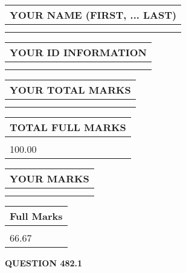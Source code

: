 \documentclass{ctexart}
\begin{document}
   
   
   
\newpage 
\setcounter{page}{ 
   482001 } 
   
   
   
   
\noindent\begin{tabular}{|l|}
\hline
YOUR NAME (FIRST, ... LAST)  \\
\hline
 \\ 
 \\ 
\hline
\end{tabular}
\hspace{0.05in} \begin{tabular}{|l|}
\hline
 YOUR   ID   INFORMATION  \\
\hline
 \\ 
 \\ 
\hline
\end{tabular}
   
   
\vspace{0.2in}\noindent\begin{tabular}{|l|}
\hline
YOUR TOTAL MARKS  \\
\hline
 \\ 
 \\ 
\hline
\end{tabular}
\hspace{0.05in} \begin{tabular}{|l|}
\hline
TOTAL FULL MARKS  \\
\hline
 \\ 
100.00 \\
\hline
\end{tabular}
   
   
 \vspace{0.2in}
 
 
 
 
   
   
  
\vspace{0.2in}
  
\noindent\begin{tabular}{|l|}
\hline
 YOUR MARKS  \\
\hline
 \\ 
 \\ 
\hline
\end{tabular}
\hspace{0.05in} \begin{tabular}{|l|}
\hline
 Full Marks  \\
\hline
 \\ 
66.67 \\
\hline
\end{tabular}
{\textbf{\Large{QUESTION
482.1 
}}}
  
\end{document}
